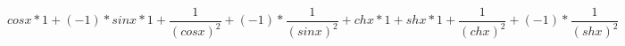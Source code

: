 \documentclass[a4paper]{article}
\begin{document}
\[
cosx*1+\left(-1\right)*sinx*1+\frac{1}{\left(cosx\right)^{2}}+\left(-1\right)*\frac{1}{\left(sinx\right)^{2}}+chx*1+shx*1+\frac{1}{\left(chx\right)^{2}}+\left(-1\right)*\frac{1}{\left(shx\right)^{2}}
\]
\end{document}
